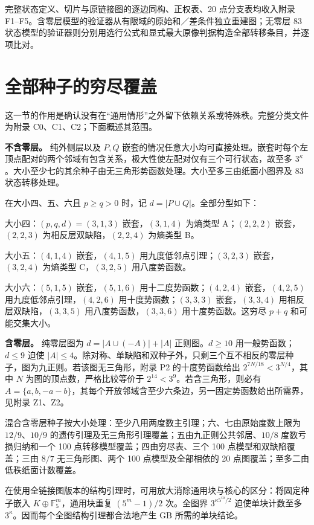 \documentclass[11pt]{ctexart}
\begin{document}
完整状态定义、切片与原链接图的逐边同构、正权表、20 点分支表均收入附录 F1--F5。含零层模型的验证器从有限域的原始和／差条件独立重建图；无零层 83 状态模型的验证器则分别用选行公式和显式最大原像判据构造全部转移条目，并逐项比对。

\section{全部种子的穷尽覆盖}

这一节的作用是确认没有在“通用情形”之外留下依赖关系或特殊秩。完整分类文件为附录 C0、C1、C2；下面概述其范围。

\textbf{不含零层。} 纯外侧层以及 \(P,Q\) 嵌套的情况任意大小均可直接处理。嵌套时每个左顶点配对的两个邻域有包含关系，极大性使左配对仅有三个可行状态，故至多 \(3^\kappa\)。大小至少七的其余种子由无三角形势函数处理。大小至多三由纸面小图界及 83 状态转移处理。

在大小四、五、六且 \(p\ge q>0\) 时，记 \(d=|P\cup Q|\)。全部分型如下：

大小四：\((p,q,d)=(3,1,3)\) 嵌套，\((3,1,4)\) 为熵类型 A；\((2,2,2)\) 嵌套，\((2,2,3)\) 为相反层双缺陷，\((2,2,4)\) 为熵类型 B。

大小五：\((4,1,4)\) 嵌套，\((4,1,5)\) 用九度低邻点引理；\((3,2,3)\) 嵌套，\((3,2,4)\) 为熵类型 C，\((3,2,5)\) 用八度势函数。

大小六：\((5,1,5)\) 嵌套，\((5,1,6)\) 用十二度势函数；\((4,2,4)\) 嵌套，\((4,2,5)\) 用九度低邻点引理，\((4,2,6)\) 用十度势函数；\((3,3,3)\) 嵌套，\((3,3,4)\) 用相反层双缺陷，\((3,3,5)\) 用八度势函数，\((3,3,6)\) 用十度势函数。这穷尽 \(p+q\) 和可能交集大小。

\textbf{含零层。} 纯零层图为 \(d=|A\cup(-A)|+|A|\) 正则图。\(d\ge10\) 用一般势函数；\(d\le9\) 迫使 \(|A|\le4\)。除对称、单缺陷和双种子外，只剩三个互不相反的零层种子，图为九正则。若该图无三角形，附录 P2 的十度势函数给出 \(2^{7N/18}<3^{N/4}\)，其中 \(N\) 为图的顶点数，严格比较等价于 \(2^{14}<3^9\)。若含三角形，则必有 \(A=\{a,b,-a-b\}\)，其每个开放邻域含至少六条边，另一固定势函数给出所需界，见附录 Z1、Z2。

混合含零层种子按大小处理：至少八用两度数主引理；六、七由原始度数上限为 \(12/9\)、\(10/9\) 的遗传引理及无三角形引理覆盖；五由九正则公共邻居、\(10/8\) 度数亏损归纳和一个 100 点转移模型覆盖；四由穷尽表、三个 100 点模型和双缺陷覆盖；三由 \(8/7\) 无三角形图、两个 100 点模型及全部相依的 20 点图覆盖；至多二由低秩纸面计数覆盖。

在使用全链接图版本的结构引理时，可用放大消除通用块与核心的区分：将固定种子嵌入 \(K\oplus\mathbb F_5^m\)，通用块重复 \((5^m-1)/2\) 次。全图界 \(3^{\kappa5^m/2}\) 迫使单块计数至多 \(3^\kappa\)。因而每个全图结构引理都合法地产生 GB 所需的单块结论。
\end{document}
